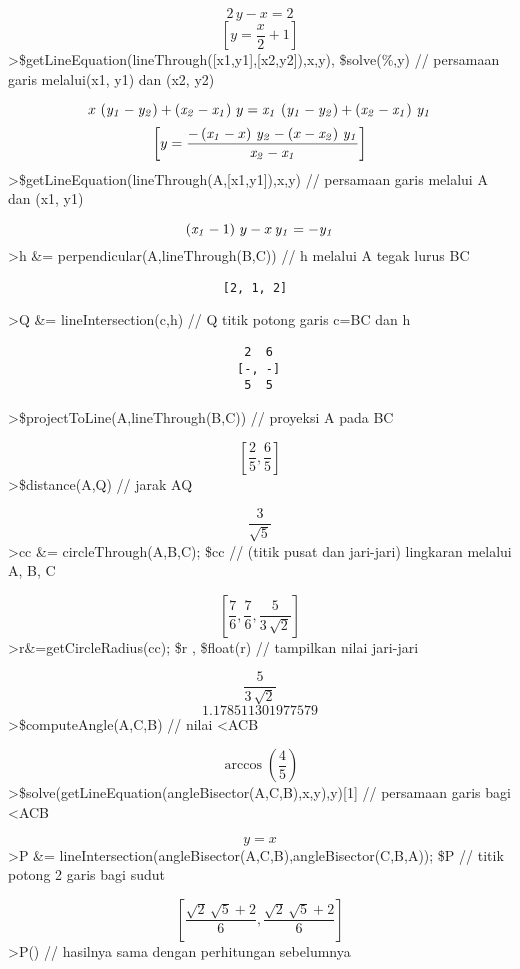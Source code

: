 \documentclass[
]{book}
\begin{document}
\[2\,y-x=2\] \[\left[ y=\frac{x}{2}+1 \right]\]\textgreater\$getLineEquation(lineThrough({[}x1,y1{]},{[}x2,y2{]}),x,y), \$solve(\%,y) // persamaan garis melalui(x1, y1) dan (x2, y2)

\[x\,\left({\it y_1}-{\it y_2}\right)+\left({\it x_2}-{\it x_1}\right)\,y={\it x_1}\,\left({\it y_1}-{\it y_2}\right)+\left({\it x_2}-{\it x_1}\right)\,{\it y_1}\] \[\left[ y=\frac{-\left({\it x_1}-x\right)\,{\it y_2}-\left(x-{\it x_2}\right)\,{\it y_1}}{{\it x_2}-{\it x_1}} \right]\]\textgreater\$getLineEquation(lineThrough(A,{[}x1,y1{]}),x,y) // persamaan garis melalui A dan (x1, y1)

\[\left({\it x_1}-1\right)\,y-x\,{\it y_1}=-{\it y_1}\]\textgreater h \&= perpendicular(A,lineThrough(B,C)) // h melalui A tegak lurus BC

\begin{verbatim}
                              [2, 1, 2]
\end{verbatim}

\textgreater Q \&= lineIntersection(c,h) // Q titik potong garis c=BC dan h

\begin{verbatim}
                                 2  6
                                [-, -]
                                 5  5
\end{verbatim}

\textgreater\$projectToLine(A,lineThrough(B,C)) // proyeksi A pada BC

\[\left[ \frac{2}{5} , \frac{6}{5} \right]\]\textgreater\$distance(A,Q) // jarak AQ

\[\frac{3}{\sqrt{5}}\]\textgreater cc \&= circleThrough(A,B,C); \$cc // (titik pusat dan jari-jari) lingkaran melalui A, B, C

\[\left[ \frac{7}{6} , \frac{7}{6} , \frac{5}{3\,\sqrt{2}} \right]\]\textgreater r\&=getCircleRadius(cc); \$r , \$float(r) // tampilkan nilai jari-jari

\[\frac{5}{3\,\sqrt{2}}\] \[1.178511301977579\]\textgreater\$computeAngle(A,C,B) // nilai \textless ACB

\[\arccos \left(\frac{4}{5}\right)\]\textgreater\$solve(getLineEquation(angleBisector(A,C,B),x,y),y){[}1{]} // persamaan garis bagi \textless ACB

\[y=x\]\textgreater P \&= lineIntersection(angleBisector(A,C,B),angleBisector(C,B,A)); \$P // titik potong 2 garis bagi sudut

\[\left[ \frac{\sqrt{2}\,\sqrt{5}+2}{6} , \frac{\sqrt{2}\,\sqrt{5}+2}{6} \right]\]\textgreater P() // hasilnya sama dengan perhitungan sebelumnya
\end{document}
